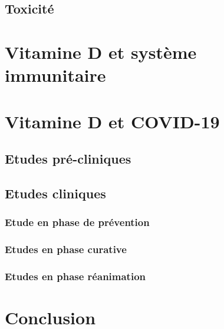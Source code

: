 \documentclass[
  letterpaper,
  DIV=11,
  numbers=noendperiod]{scrartcl}
\begin{document}
\hypertarget{toxicituxe9}{%
\subsection{Toxicité}\label{toxicituxe9}}

\hypertarget{vitamine-d-et-systuxe8me-immunitaire}{%
\section{Vitamine D et système
immunitaire}\label{vitamine-d-et-systuxe8me-immunitaire}}

\textcite{Dankers.2017}

\hypertarget{vitamine-d-et-covid-19}{%
\section{Vitamine D et COVID-19}\label{vitamine-d-et-covid-19}}

\hypertarget{etudes-pruxe9-cliniques}{%
\subsection{Etudes pré-cliniques}\label{etudes-pruxe9-cliniques}}

\hypertarget{etudes-cliniques}{%
\subsection{Etudes cliniques}\label{etudes-cliniques}}

\hypertarget{etude-en-phase-de-pruxe9vention}{%
\subsubsection{Etude en phase de
prévention}\label{etude-en-phase-de-pruxe9vention}}

\hypertarget{etudes-en-phase-curative}{%
\subsubsection{Etudes en phase
curative}\label{etudes-en-phase-curative}}

\hypertarget{etudes-en-phase-ruxe9animation}{%
\subsubsection{Etudes en phase
réanimation}\label{etudes-en-phase-ruxe9animation}}

\newpage{}

\hypertarget{conclusion}{%
\section{Conclusion}\label{conclusion}}

\newpage{}


\printbibliography[title=References]
\end{document}
